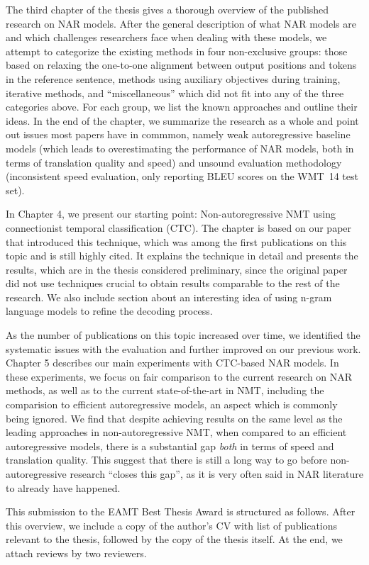 \documentclass[12pt,a4paper]{article}
\begin{document}
The third chapter of the thesis gives a thorough overview of the published
research on NAR models. After the general description of what NAR models are
and which challenges researchers face when dealing with these models, we
attempt to categorize the existing methods in four non-exclusive groups: those
based on relaxing the one-to-one alignment between output positions and tokens
in the reference sentence, methods using auxiliary objectives during training,
iterative methods, and ``miscellaneous'' which did not fit into any of the
three categories above. For each group, we list the known approaches and
outline their ideas. In the end of the chapter, we summarize the research as a
whole and point out issues most papers have in commmon, namely weak
autoregressive baseline models (which leads to overestimating the performance
of NAR models, both in terms of translation quality and speed) and unsound
evaluation methodology (inconsistent speed evaluation, only reporting BLEU
scores on the WMT~14 test set).

In Chapter 4, we present our starting point: Non-autoregressive NMT using
connectionist temporal classification (CTC). The chapter is based on our paper
that introduced this technique, which was among the first publications on this
topic and is still highly cited. It explains the technique in detail and
presents the results, which are in the thesis considered preliminary, since the
original paper did not use techniques crucial to obtain results comparable to
the rest of the research. We also include section about an interesting idea of
using n-gram language models to refine the decoding process.

As the number of publications on this topic increased over time, we identified
the systematic issues with the evaluation and further improved on our previous
work. Chapter 5 describes our main experiments with CTC-based NAR models. In
these experiments, we focus on fair comparison to the current research on NAR
methods, as well as to the current state-of-the-art in NMT, including the
comparision to efficient autoregressive models, an aspect which is commonly
being ignored. We find that despite achieving results on the same level as the
leading approaches in non-autoregressive NMT, when compared to an efficient
autoregressive models, there is a substantial gap \emph{both} in terms of speed
and translation quality. This suggest that there is still a long way to go
before non-autoregressive research ``closes this gap'', as it is very often
said in NAR literature to already have happened.

This submission to the EAMT Best Thesis Award is structured as follows. After
this overview, we include a copy of the author's CV with list of publications
relevant to the thesis, followed by the copy of the thesis itself. At the end,
we attach reviews by two reviewers.
\end{document}
